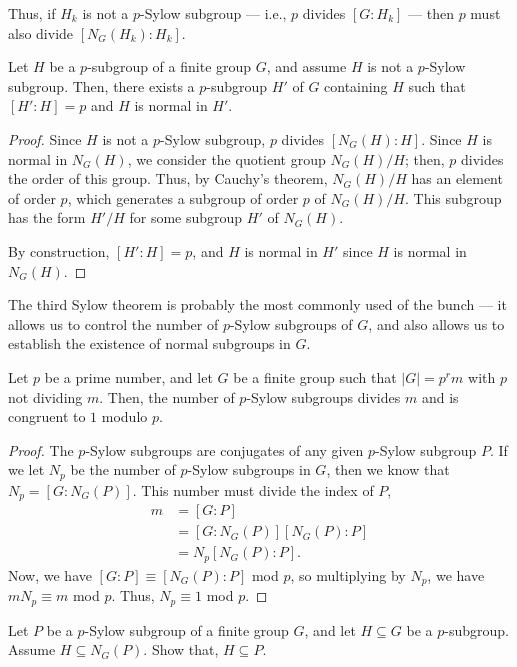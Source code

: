 \documentclass[10pt]{mypackage}
\begin{document}
Thus, if $H_k$ is not a $p$-Sylow subgroup --- i.e., $p$ divides $\left[ G:H_k \right]$ --- then $p$ must also divide $\left[ N_G\left(H_k\right) : H_k \right]$.
\begin{proposition}
  Let $H$ be a $p$-subgroup of a finite group $G$, and assume $H$ is not a $p$-Sylow subgroup. Then, there exists a $p$-subgroup $H'$ of $G$ containing $H$ such that $\left[ H':H \right] = p$ and $H$ is normal in $H'$.
\end{proposition}
\begin{proof}
  Since $H$ is not a $p$-Sylow subgroup, $p$ divides $\left[ N_G(H):H \right]$. Since $H$ is normal in $N_G(H)$, we consider the quotient group $N_G(H)/H$; then, $p$ divides the order of this group. Thus, by Cauchy's theorem, $N_G(H)/H$ has an element of order $p$, which generates a subgroup of order $p$ of $N_G(H)/H$. This subgroup has the form $H'/H$ for some subgroup $H'$ of $N_G(H)$.\newline

  By construction, $\left[ H':H \right] = p$, and $H$ is normal in $H'$ since $H$ is normal in $N_G(H)$.
\end{proof}
The third Sylow theorem is probably the most commonly used of the bunch --- it allows us to control the number of $p$-Sylow subgroups of $G$, and also allows us to establish the existence of normal subgroups in $G$.
\begin{theorem}
  Let $p$ be a prime number, and let $G$ be a finite group such that $\left\vert G \right\vert = p^{r} m$ with $p$ not dividing $m$. Then, the number of $p$-Sylow subgroups divides $m$ and is congruent to $1$ modulo $p$.
\end{theorem}
\begin{proof}
  The $p$-Sylow subgroups are conjugates of any given $p$-Sylow subgroup $P$. If we let $N_p$ be the number of $p$-Sylow subgroups in $G$, then we know that $N_p = \left[ G:N_G(P) \right]$. This number must divide the index of $P$,
  \begin{align*}
    m &= \left[ G:P \right]\\
      &= \left[ G:N_G(P) \right]\left[ N_G(P):P \right]\\
      &= N_p\left[ N_G(P):P \right].
  \end{align*}
  Now, we have $\left[ G:P \right]\equiv \left[ N_G(P):P \right]$ mod $p$, so multiplying by $N_p$, we have $mN_p \equiv m$ mod $p$. Thus, $N_p\equiv 1$ mod $p$.
\end{proof}
\begin{exercise}
  Let $P$ be a $p$-Sylow subgroup of a finite group $G$, and let $H\subseteq G$ be a $p$-subgroup. Assume $H\subseteq N_{G}\left( P \right)$. Show that, $H\subseteq P$.
\end{exercise}
\end{document}
